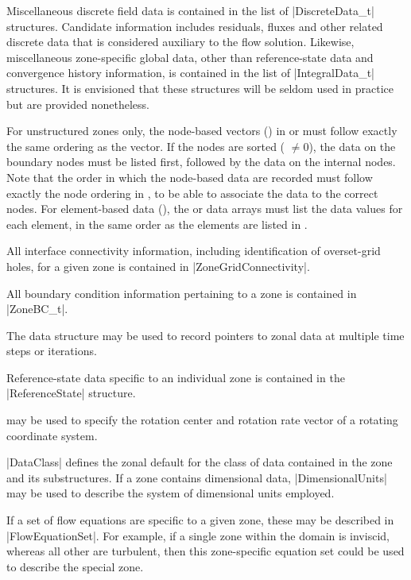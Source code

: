 Miscellaneous discrete field data is contained in the list of
|DiscreteData_t| structures.
Candidate information includes residuals, fluxes and other related
discrete data that is considered auxiliary to the flow solution.
Likewise, miscellaneous zone-specific global data, other than
reference-state data and convergence history information, is contained
in the list of |IntegralData_t| structures.
It is envisioned that these structures will be seldom used in practice
but are provided nonetheless.

For unstructured zones only, the node-based 
vectors () in  or
 must follow exactly the same ordering as the
 vector.
If the nodes are sorted ( $\neq 0$), the data
on the boundary nodes must be listed first, followed by the data on the
internal nodes.
Note that the order in which the node-based data are recorded must
follow exactly the node ordering in , to be
able to associate the data to the correct nodes.
For element-based data (), the
 or  data arrays must list
the data values for each element, in the same order as the elements are
listed in .

All interface connectivity information, including identification
of overset-grid holes, for a given zone is contained in
|ZoneGridConnectivity|.

All boundary condition information pertaining to a zone is contained in 
|ZoneBC_t|.

The  data structure may be used to record
pointers to zonal data at multiple time steps or iterations.

Reference-state data specific to an individual zone is contained in the
|ReferenceState| structure.  

 may be used to specify the rotation center
and rotation rate vector of a rotating coordinate system.

|DataClass| defines the zonal default for the class of data contained in
the zone and its substructures.  If a zone contains dimensional data,
|DimensionalUnits| may be used to describe the system of
dimensional units employed.

If a set of flow equations are specific to a given zone, these may be
described in |FlowEquationSet|.  For example, if a single zone within
the domain is inviscid, whereas all other are turbulent, then this
zone-specific equation set could be used to describe the special zone.

